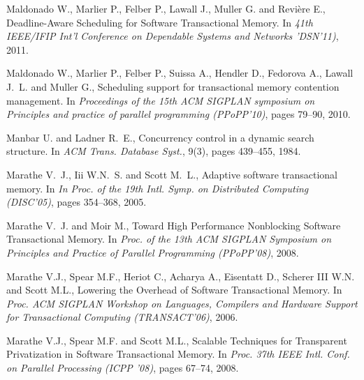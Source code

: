 \begin{thebibliography}{99}
{%
Maldonado W.,  Marlier P., Felber P.,  Lawall J., Muller G. and Revi\`ere E., 
Deadline-Aware Scheduling for Software Transactional Memory. 
In {\it 41th  IEEE/IFIP Int'l  Conference on  Dependable  Systems and Networks
'DSN'11)}, 2011.


Maldonado W., Marlier P., Felber P., Suissa A., Hendler D.,
  Fedorova A., Lawall J.~L. and Muller G.,
\newblock Scheduling support for transactional memory contention management.
\newblock In {\em Proceedings of the 15th ACM SIGPLAN symposium on
  Principles and practice of parallel programming (PPoPP'10)}, pages 79--90, 2010.



Manbar U. and Ladner R.~E.,
\newblock Concurrency control in a dynamic search structure.
\newblock In {\em ACM Trans. Database Syst.}, 9(3), pages 439--455, 1984.






Marathe V.~J., Iii W.N.~S. and  Scott M.~L.,
\newblock Adaptive software transactional memory.
\newblock In {\em In Proc. of the 19th Intl. Symp. on Distributed Computing (DISC'05)},
  pages 354--368, 2005.

Marathe V.~J. and Moir M.,
Toward High Performance Nonblocking Software Transactional Memory. 
In {\em Proc. of the 13th ACM SIGPLAN Symposium on Principles and Practice of Parallel Programming (PPoPP'08)}, 2008.


Marathe  V.J.,  Spear M.F., Heriot  C., Acharya A., Eisentatt  D., Scherer
III W.N. and Scott M.L.,
Lowering the Overhead of Software Transactional Memory. 
In {\it  Proc.  ACM SIGPLAN  Workshop on  Languages, Compilers  and Hardware
Support for Transactional Computing (TRANSACT'06)}, 2006. 


Marathe V.J., Spear M.F. and Scott M.L.,
\newblock Scalable Techniques for Transparent Privatization in Software Transactional Memory.
\newblock In {\em Proc. 37th IEEE Intl. Conf. on Parallel Processing (ICPP '08)}, pages 67--74, 2008.



}
\end{thebibliography}
